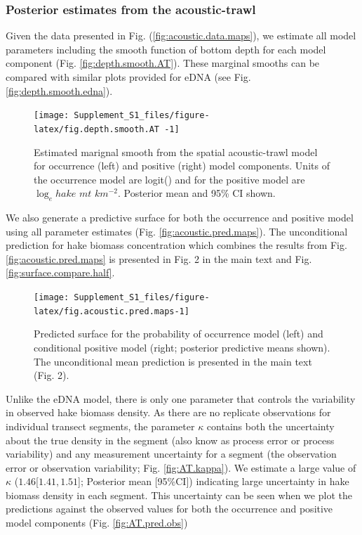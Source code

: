 \documentclass[
]{article}
\begin{document}
\hypertarget{posterior-estimates-from-the-acoustic-trawl}{%
\subsubsection{Posterior estimates from the
acoustic-trawl}\label{posterior-estimates-from-the-acoustic-trawl}}

Given the data presented in Fig. (\ref{fig:acoustic.data.maps}), we
estimate all model parameters including the smooth function of bottom
depth for each model component (Fig. \ref{fig:depth.smooth.AT}). These
marginal smooths can be compared with similar plots provided for eDNA
(see Fig. \ref{fig:depth.smooth.edna}).

\begin{figure}
\texttt{[image: Supplement\_S1\_files/figure-latex/fig.depth.smooth.AT -1]} \caption{\label{fig:depth.smooth.AT} Estimated marignal smooth from the spatial acoustic-trawl model for occurrence (left) and positive (right) model components. Units of the occurrence model are logit() and for the positive model are \(\log_e hake\) \(mt\) \(km^{-2}\). Posterior mean and 95\% CI shown.}\label{fig:fig.depth.smooth.AT }
\end{figure}

We also generate a predictive surface for both the occurrence and
positive model using all parameter estimates (Fig.
\ref{fig:acoustic.pred.maps}). The unconditional prediction for hake
biomass concentration which combines the results from Fig.
\ref{fig:acoustic.pred.maps} is presented in Fig. 2 in the main text and
Fig. \ref{fig:surface.compare.half}.

\begin{figure}
\texttt{[image: Supplement\_S1\_files/figure-latex/fig.acoustic.pred.maps-1]} \caption{\label{fig:acoustic.pred.maps} Predicted surface for the probability of occurrence model (left) and conditional positive model (right; posterior predictive means shown). The unconditional mean prediction is presented in the main text (Fig. 2). }\label{fig:fig.acoustic.pred.maps}
\end{figure}

Unlike the eDNA model, there is only one parameter that controls the
variability in observed hake biomass density. As there are no replicate
observations for individual transect segments, the parameter \(\kappa\)
contains both the uncertainty about the true density in the segment
(also know as process error or process variability) and any measurement
uncertainty for a segment (the observation error or observation
variability; Fig. \ref{fig:AT.kappa}). We estimate a large value of
\(\kappa\) (\(1.46\){[}\(1.41, 1.51\){]}; Posterior mean {[}95\%CI{]})
indicating large uncertainty in hake biomass density in each segment.
This uncertainty can be seen when we plot the predictions against the
observed values for both the occurrence and positive model components
(Fig. \ref{fig:AT.pred.obs})
\end{document}
